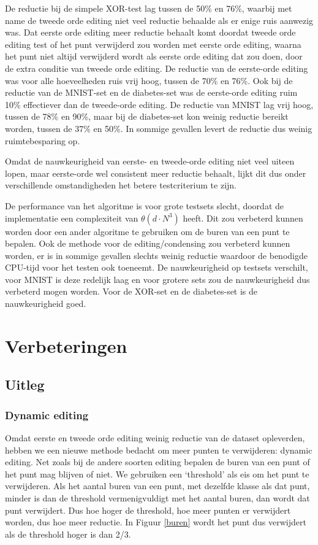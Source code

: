 \documentclass{article}
\begin{document}
De reductie bij de simpele XOR-test lag tussen de 50\% en 76\%, waarbij met name de tweede orde editing niet veel reductie behaalde als er enige ruis aanwezig was. Dat eerste orde editing meer reductie behaalt komt doordat tweede orde editing test of het punt verwijderd zou worden met eerste orde editing, waarna het punt niet altijd verwijderd wordt als eerste orde editing dat zou doen, door de extra conditie van tweede orde editing. De reductie van de eerste-orde editing was voor alle hoeveelheden ruis vrij hoog, tussen de 70\% en 76\%. Ook bij de reductie van de MNIST-set en de diabetes-set was de eerste-orde editing ruim 10\% effectiever dan de tweede-orde editing. De reductie van MNIST lag vrij hoog, tussen de 78\% en 90\%, maar bij de diabetes-set kon weinig reductie bereikt worden, tussen de 37\% en 50\%. In sommige gevallen levert de reductie dus weinig ruimtebesparing op.

Omdat de nauwkeurigheid van eerste- en tweede-orde editing niet veel uiteen lopen, maar eerste-orde wel consistent meer reductie behaalt, lijkt dit dus onder verschillende omstandigheden het betere testcriterium te zijn.

De performance van het algoritme is voor grote testsets slecht, doordat de implementatie een complexiteit van $\theta (d\cdot N^3)$ heeft. Dit zou verbeterd kunnen worden door een ander algoritme te gebruiken om de buren van een punt te bepalen. Ook de methode voor de editing/condensing zou verbeterd kunnen worden, er is in sommige gevallen slechts weinig reductie waardoor de benodigde CPU-tijd voor het testen ook toeneemt. De nauwkeurigheid op testsets verschilt, voor MNIST is deze redelijk laag en voor grotere sets zou de nauwkeurigheid dus verbeterd mogen worden. Voor de XOR-set en de diabetes-set is de nauwkeurigheid goed.

\section{Verbeteringen} %

\subsection{Uitleg}
\subsubsection{Dynamic editing}
Omdat eerste en tweede orde editing weinig reductie van de dataset opleverden, hebben we een nieuwe methode bedacht om meer punten te verwijderen: dynamic editing. Net zoals bij de andere soorten editing bepalen de buren van een punt of het punt mag blijven of niet. We gebruiken een ‘threshold’ als eis om het punt te verwijderen. Als het aantal buren van een punt, met dezelfde klasse als dat punt, minder is dan de threshold vermenigvuldigt met het aantal buren, dan wordt dat punt verwijdert. Dus hoe hoger de threshold, hoe meer punten er verwijdert worden, dus hoe meer reductie. In Figuur \ref{buren} wordt het punt dus verwijdert als de threshold hoger is dan 2/3.
\clearpage
\end{document}
